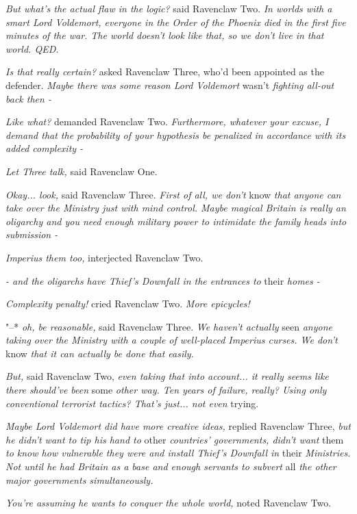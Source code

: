 \emph{But what's the actual flaw in the logic?} said Ravenclaw Two.
\emph{In worlds with a smart Lord Voldemort, everyone in the Order of
the Phoenix died in the first five minutes of the war. The world doesn't
look like that, so we don't live in that world. QED.}

\emph{Is that really certain?} asked Ravenclaw Three, who'd been
appointed as the defender. \emph{Maybe there was some reason Lord
Voldemort} wasn't \emph{fighting all-out back then -}

\emph{Like what?} demanded Ravenclaw Two. \emph{Furthermore, whatever
your excuse, I demand that the probability of your hypothesis be
penalized in accordance with its added complexity -}

\emph{Let Three talk,} said Ravenclaw One.

\emph{Okay... look,} said Ravenclaw Three. \emph{First of all, we
don't} know \emph{that anyone can take over the Ministry just with mind
control. Maybe magical Britain is really an oligarchy and you need
enough military power to intimidate the family heads into submission -}

\emph{Imperius them too,} interjected Ravenclaw Two.

\emph{- and the oligarchs have Thief's Downfall in the entrances to}
their \emph{homes -}

\emph{Complexity penalty!} cried Ravenclaw Two. \emph{More epicycles!}

"--* \emph{oh, be reasonable,} said Ravenclaw Three. \emph{We haven't
actually} seen \emph{anyone taking over the Ministry with a couple of
well-placed Imperius curses. We don't} know \emph{that it can actually
be done that easily.}

\emph{But,} said Ravenclaw Two, \emph{even taking that into
account... it really seems like there should've been} some
\emph{other way. Ten years of failure, really? Using only conventional
terrorist tactics? That's just... not even} trying.

\emph{Maybe Lord Voldemort did have more creative ideas,} replied
Ravenclaw Three, \emph{but he didn't want to tip his hand to} other
\emph{countries' governments, didn't want} them \emph{to know how
vulnerable they were and install Thief's Downfall in} their
\emph{Ministries. Not until he had Britain as a base and enough servants
to subvert} all \emph{the other major governments simultaneously.}

\emph{You're assuming he wants to conquer the whole world,} noted
Ravenclaw Two.

